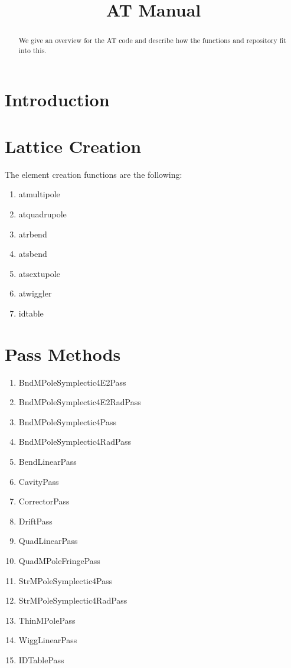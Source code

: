 \documentclass[acus]{article}
\begin{document}
\title{AT Manual}
\maketitle
\begin{abstract}
We give an overview for the AT code and describe how the functions and repository fit into this.
\end{abstract}


\section{Introduction}

\section{Lattice Creation}
The element creation functions are the following:
\begin{enumerate}
\item atmultipole
\item atquadrupole
\item atrbend
\item atsbend
\item atsextupole
\item atwiggler
\item idtable
\end{enumerate}



\section{Pass Methods}

\begin{enumerate}
\item BndMPoleSymplectic4E2Pass
\item BndMPoleSymplectic4E2RadPass
\item BndMPoleSymplectic4Pass
\item BndMPoleSymplectic4RadPass
\item BendLinearPass
\item CavityPass
\item CorrectorPass
\item DriftPass
\item QuadLinearPass
\item QuadMPoleFringePass
\item StrMPoleSymplectic4Pass
\item StrMPoleSymplectic4RadPass
\item ThinMPolePass
\item WiggLinearPass
\item IDTablePass
\end{enumerate}
\end{document}
